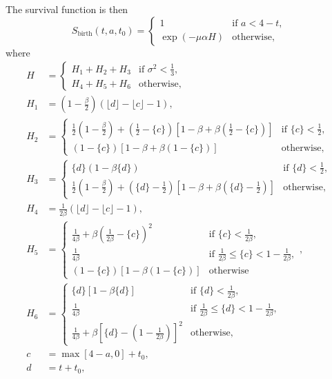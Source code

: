 \documentclass{jpmarticle}
\begin{document}
The survival function is then
\begin{equation}
  S_{\text{birth}}(t, a, t_0) =
  \begin{cases}
    1 & \text{if $a < 4 - t$},
    \\
    \exp(-\mu \alpha H) & \text{otherwise},
  \end{cases}
\end{equation}
where
\begin{align}
  H &=
  \begin{cases}
    H_1 + H_2  + H_3
    & \text{if $\sigma^2 < \frac{1}{3}$},
    \\
    H_4 + H_5 + H_6
    & \text{otherwise},
  \end{cases}
  \\
  H_1 &= \left(1 - \frac{\beta}{2}\right)
  \left(\lfloor d \rfloor - \lfloor c \rfloor - 1\right),
  \\
  H_2 &=
  \begin{cases}
    \frac{1}{2} \left(1 - \frac{\beta}{2}\right)
    + \left(\frac{1}{2} - \{c\}\right)
    \left[1 - \beta
      + \beta \left(\frac{1}{2} - \{c\}\right)\right]
    & \text{if $\{c\} < \frac{1}{2}$},
    \\
    \left(1 - \{c\}\right)
    \left[1 - \beta + \beta \left(1 - \{c\}\right)\right]
    & \text{otherwise},
  \end{cases}
  \\
  H_3 &=
  \begin{cases}
    \{d\}\left(1 - \beta \{d\}\right)
    & \text{if $\{d\} < \frac{1}{2}$},
    \\
    \frac{1}{2} \left(1 - \frac{\beta}{2}\right)
    + \left(\{d\} - \frac{1}{2}\right)
    \left[1 - \beta + \beta \left(\{d\} - \frac{1}{2}\right)\right]
    & \text{otherwise},
    \end{cases}
  \\
  H_4 &= \frac{1}{2 \beta}
  \left(\lfloor d \rfloor - \lfloor c \rfloor - 1\right),
  \\
  H_5 &=
  \begin{cases}
    \frac{1}{4 \beta} + \beta \left(\frac{1}{2 \beta} - \{c\}\right)^2
    & \text{if $\{c\} < \frac{1}{2 \beta}$},
    \\
    \frac{1}{4 \beta}
    & \text{if $\frac{1}{2 \beta} \leq \{c\} < 1 - \frac{1}{2 \beta}$},
    \\
    \left(1 - \{c\}\right) \left[1 -
      \beta \left(1 - \{c\}\right)\right]
    & \text{otherwise}
  \end{cases},
  \\
  H_6 &=
  \begin{cases}
    \{d\} \left[1 - \beta \{d\}\right]
    & \text{if $\{d\} < \frac{1}{2 \beta}$},
    \\
    \frac{1}{4 \beta}
    & \text{if $\frac{1}{2 \beta} \leq \{d\} <
      1 - \frac{1}{2 \beta}$},
    \\
    \frac{1}{4 \beta} + \beta \left[\{d\} - \left(1
        - \frac{1}{2 \beta}\right)\right]^2
    & \text{otherwise},
  \end{cases}
  \\
  c &= \max[4 - a, 0] + t_0,
  \\
  d &= t + t_0,
\end{align}
\end{document}
